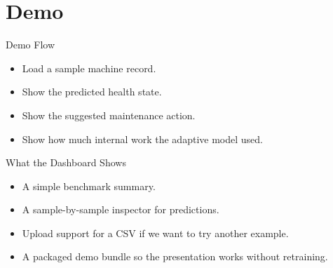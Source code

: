 \section{Demo}

\begin{frame}{Demo Flow}
  \begin{itemize}
    \item Load a sample machine record.
    \item Show the predicted health state.
    \item Show the suggested maintenance action.
    \item Show how much internal work the adaptive model used.
  \end{itemize}
\end{frame}

\begin{frame}{What the Dashboard Shows}
  \begin{itemize}
    \item A simple benchmark summary.
    \item A sample-by-sample inspector for predictions.
    \item Upload support for a CSV if we want to try another example.
    \item A packaged demo bundle so the presentation works without retraining.
  \end{itemize}
\end{frame}
